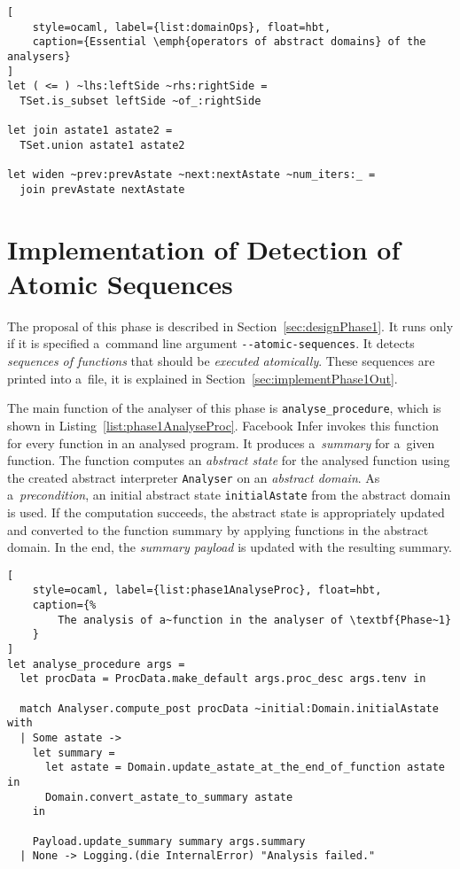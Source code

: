 \begin{lstlisting}[
    style=ocaml, label={list:domainOps}, float=hbt,
    caption={Essential \emph{operators of abstract domains} of the analysers}
]
let ( <= ) ~lhs:leftSide ~rhs:rightSide =
  TSet.is_subset leftSide ~of_:rightSide

let join astate1 astate2 =
  TSet.union astate1 astate2

let widen ~prev:prevAstate ~next:nextAstate ~num_iters:_ =
  join prevAstate nextAstate
\end{lstlisting}


\section{Implementation of Detection of Atomic Sequences}
\label{sec:implementPhase1}

The proposal of this phase is described in Section~\ref{sec:designPhase1}.
It runs only if it is specified a~command line argument
\texttt{{-}{-}atomic-sequences}. It detects \emph{sequences of functions}
that should be \emph{executed atomically}. These sequences are printed into
a~file, it is explained in Section~\ref{sec:implementPhase1Out}.

The main function of the analyser of this phase is
\texttt{analyse\_procedure}, which is shown in
Listing~\ref{list:phase1AnalyseProc}. Facebook Infer invokes
this function for every function in an analysed program. It produces
a~\emph{summary} for a~given function. The function computes an
\emph{abstract state} for the analysed function using the created abstract
interpreter \texttt{Analyser} on an \emph{abstract domain}. As
a~\emph{precondition}, an initial abstract state \texttt{initialAstate} from
the abstract domain is used. If the computation succeeds, the abstract
state is appropriately updated and converted to the function summary by
applying functions in the abstract domain. In the end, the \emph{summary
payload} is updated with the resulting summary.

\begin{lstlisting}[
    style=ocaml, label={list:phase1AnalyseProc}, float=hbt,
    caption={%
        The analysis of a~function in the analyser of \textbf{Phase~1}
    }
]
let analyse_procedure args =
  let procData = ProcData.make_default args.proc_desc args.tenv in

  match Analyser.compute_post procData ~initial:Domain.initialAstate with
  | Some astate ->
    let summary =
      let astate = Domain.update_astate_at_the_end_of_function astate in
      Domain.convert_astate_to_summary astate
    in

    Payload.update_summary summary args.summary
  | None -> Logging.(die InternalError) "Analysis failed."
\end{lstlisting}

